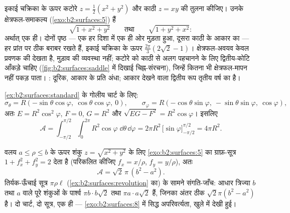 \begin{example}\label{ex:b2:surfaces:samearea}
इकाई चक्रिका के ऊपर कटोरे $z = \frac12(x^2 + y^2)$ और काठी
$z = xy$ की तुलना कीजिए। उनके क्षेत्रफल-समाकल्य
(\cref{exo:b2:surfaces:5}) हैं
\[
\sqrt{1 + x^2 + y^2}
\qquad\text{तथा}\qquad
\sqrt{1 + y^2 + x^2} :
\]
अर्थात् एक ही। दोनों पृष्ठ --- एक हर दिशा में एक ही ओर मुड़ता हुआ,
दूसरा काठी के आकार का --- हर प्रांत पर ठीक बराबर  रखते हैं,
इकाई चक्रिका के ऊपर $\frac{2\pi}3(2\sqrt2 - 1)$। क्षेत्रफल-अवयव केवल प्रवणक की
\emph{} देखता है, मुड़ाव की व्यवस्था नहीं; कटोरे को काठी से
अलग पहचानने के लिए द्वितीय-कोटि आँकड़े चाहिए (\cref{fig:b2:surfaces:saddle} में दिखाई
चिह्न-संरचना), जिन्हें कितना भी क्षेत्रफल-मापन नहीं पकड़ पाता। : दूरिक, आकार के प्रति अंधा; आकार देखने वाला द्वितीय रूप
तृतीय वर्ष का है।
\end{example}

\begin{example}[गोले का क्षेत्रफल]\label{ex:b2:surfaces:spherearea}
\cref{ex:b2:surfaces:standard} के गोलीय चार्ट के लिए:
\[
\sigma_\theta = R(-\sin\theta\cos\varphi,\
\cos\theta\cos\varphi,\ 0),
\qquad
\sigma_\varphi = R(-\cos\theta\sin\varphi,\
-\sin\theta\sin\varphi,\ \cos\varphi),
\]
अतः $E = R^2\cos^2\varphi$, $F = 0$, $G = R^2$ और $\sqrt{EG - F^2}
= R^2\cos\varphi$। इसलिए
\[
\mathcal{A}
= \int_{-\pi/2}^{\pi/2}\!\!\int_0^{2\pi}
R^2\cos\varphi\;\dd\theta\,\dd\varphi
= 2\pi R^2\,\bigl[\sin\varphi\bigr]_{-\pi/2}^{\pi/2}
= \boxed{4\pi R^2} .
\]
\end{example}

\begin{example}[शंकु, स्कूली सूत्र के सामने
जाँचा गया]\label{ex:b2:surfaces:conearea}
वलय $a \leq
\rho \leq b$ के ऊपर शंकु $z = \sqrt{x^2 + y^2}$ के लिए \cref{exo:b2:surfaces:5} का ग्राफ़-सूत्र
$1 + f_x^2 + f_y^2 = 2$ देता है (परिकलित कीजिए $f_x = x/\rho$, $f_y = y/\rho$), अतः
\[
\mathcal A = \sqrt2\,\pi\,(b^2 - a^2) .
\]
तिर्यक-ऊँचाई सूत्र $\pi\rho\ell$ (\cref{ex:b2:surfaces:revolution} का) के सामने संगति-जाँच: आधार
त्रिज्या $b$ तथा $a$ वाले पूरे शंकुओं के पार्श्व 
$\pi b\cdot b\sqrt2$ तथा $\pi a\cdot a\sqrt2$ हैं, जिनका अंतर ठीक $\sqrt2\pi(b^2 - a^2)$ है। दो चार्ट, दो
सूत्र, एक ही \omterm{def:b2:surfaces:area}{क्षेत्रफल} --- \cref{exo:b2:surfaces:8} में सिद्ध अपरिवर्त्यता, खुले में
देखी हुई।
\end{example}

